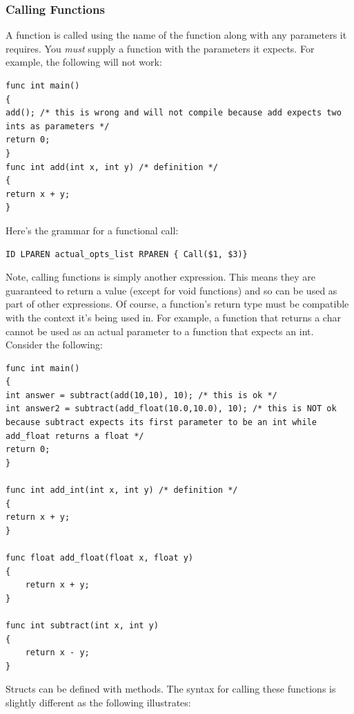 \documentclass{article}
\begin{document}
\subsubsection{Calling Functions}

A function is called using the name of the function along with any parameters it requires. You \emph{must} supply a function with the parameters it expects. For example, the following will not work:

\begin{lstlisting}
func int main()
{
add(); /* this is wrong and will not compile because add expects two ints as parameters */
return 0;
}
func int add(int x, int y) /* definition */
{
return x + y;
}

\end{lstlisting}

Here's the grammar for a functional call:
\begin{Verbatim}[frame=single]
	 ID LPAREN actual_opts_list RPAREN { Call($1, $3)}
\end{Verbatim}

Note, calling functions is simply another expression. This means they are guaranteed to return a value (except for void functions) and so can be used as part of other expressions. Of course, a function's return type must be compatible with the context it's being used in. For example, a function that returns a char cannot be used as an actual parameter to a function that expects an int.  Consider the following:

\begin{lstlisting}
func int main()
{
int answer = subtract(add(10,10), 10); /* this is ok */
int answer2 = subtract(add_float(10.0,10.0), 10); /* this is NOT ok because subtract expects its first parameter to be an int while add_float returns a float */
return 0;
}

func int add_int(int x, int y) /* definition */
{
return x + y;
}

func float add_float(float x, float y)
{
	return x + y;
}

func int subtract(int x, int y)
{
	return x - y;
}

\end{lstlisting}

Structs can be defined with methods. The syntax for calling these functions is slightly different as the following illustrates:
\end{document}
